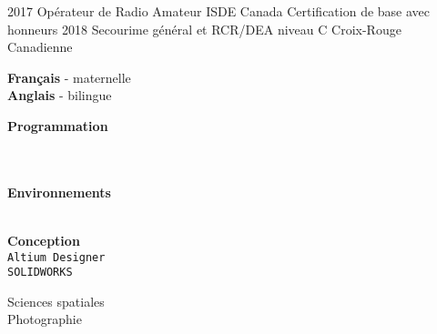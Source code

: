 \documentclass[9pt]{developercv} %
\begin{document}
\begin{minipage}[t]{0.8\textwidth}


\begin{entrylist}
	\entry
		{2017}
		{Opérateur de Radio Amateur}
		{ISDE Canada}
		{
			Certification de base avec honneurs
		}
	\entry
		{2018}
		{Secourime général et RCR/DEA niveau C}
		{Croix-Rouge Canadienne}
		{\vspace{-14pt}}
\end{entrylist}
\end{minipage}
\begin{minipage}[t]{0.02\textwidth}
	\hfill
\end{minipage}
\begin{minipage}[t]{0.18\textwidth}
		\textbf{Français} - maternelle\\
		\textbf{Anglais} - bilingue

		\textbf{Programmation}
		\begin{barchart}{1.75}
		\end{barchart}
		\\\\
		\textbf{Environnements}
		\begin{barchart}{1.75}
		\end{barchart}
		\\
		\textbf{Conception}\\
		\texttt{Altium Designer}\\
		\texttt{SOLIDWORKS}

		Sciences spatiales\\
		Photographie

\end{minipage}

\end{document}
